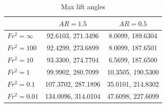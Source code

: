 \begin{table}
\centering
\begin{tabular}{lcc}
                 & $AR = 1.5$          & $AR = 0.5$         \\ \hline
 $Fr^2 = \infty$ & 92.6103, 271.3496   & 8.0099, 189.6304   \\
 $Fr^2 = 100$    & 92.4299, 273.6899   & 8.0099, 187.6501   \\
 $Fr^2 = 10$     & 93.3300, 274.7704   & 6.5699, 187.6500   \\
 $Fr^2 = 1$      & 99.9902, 280.7099   & 10.3505, 190.5300  \\
 $Fr^2 = 0.1$    & 107.3702, 287.1896  & 35.0101, 214.8302  \\
 $Fr^2 = 0.01$   & 134.0096, 314.0104  & 47.6098, 227.6099             
\end{tabular}
\caption{Max lift angles}
\label{tab:max_lift}
\end{table}
